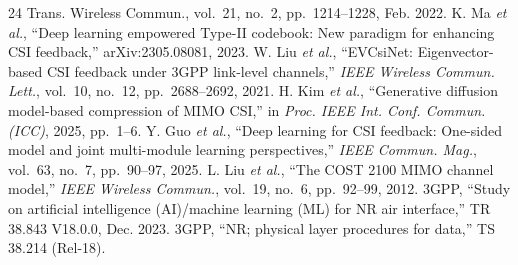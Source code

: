 \documentclass[journal]{IEEEtran}
\begin{document}
\begin{thebibliography}{24}
{Trans. Wireless Commun.}, vol.~21, no.~2, pp.~1214--1228, Feb. 2022.
 K. Ma \emph{et al.}, ``Deep learning empowered Type-II
codebook: New paradigm for enhancing CSI feedback,'' arXiv:2305.08081, 2023.
 W. Liu \emph{et al.}, ``EVCsiNet: Eigenvector-based CSI feedback
under 3GPP link-level channels,'' \emph{IEEE Wireless Commun. Lett.}, vol.~10,
no.~12, pp.~2688--2692, 2021.
 H. Kim \emph{et al.}, ``Generative diffusion model-based
compression of MIMO CSI,'' in \emph{Proc. IEEE Int. Conf. Commun. (ICC)}, 2025,
pp.~1--6.
 Y. Guo \emph{et al.}, ``Deep learning for CSI feedback:
One-sided model and joint multi-module learning perspectives,'' \emph{IEEE Commun.
Mag.}, vol.~63, no.~7, pp.~90--97, 2025.
 L. Liu \emph{et al.}, ``The COST 2100 MIMO channel model,''
\emph{IEEE Wireless Commun.}, vol.~19, no.~6, pp.~92--99, 2012.
 3GPP, ``Study on artificial intelligence (AI)/machine learning
(ML) for NR air interface,'' TR 38.843 V18.0.0, Dec. 2023.
 3GPP, ``NR; physical layer procedures for data,'' TS 38.214
(Rel-18).
\end{thebibliography}

\balance
\end{document}
